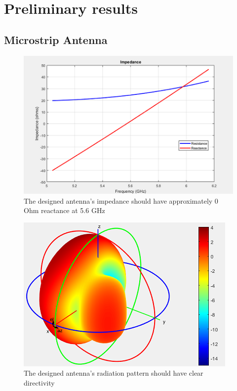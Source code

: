 \documentclass[11pt,a4paper]{article}
\begin{document}
  \pagebreak

  \section{Preliminary results}
    \subsection{Microstrip Antenna}
      \begin{figure}[h]
        \includegraphics{Impedance.png}
        \centering
        \caption{The designed antenna's impedance should have approximately 0 Ohm reactance at 5.6 GHz}
        \label{fig:1}
      \end{figure}

      \begin{figure}[h]
        \includegraphics{Radiation_pattern}
        \centering
        \caption{The designed antenna's radiation pattern should have clear directivity}
        \label{fig:2}
      \end{figure}
\end{document}
